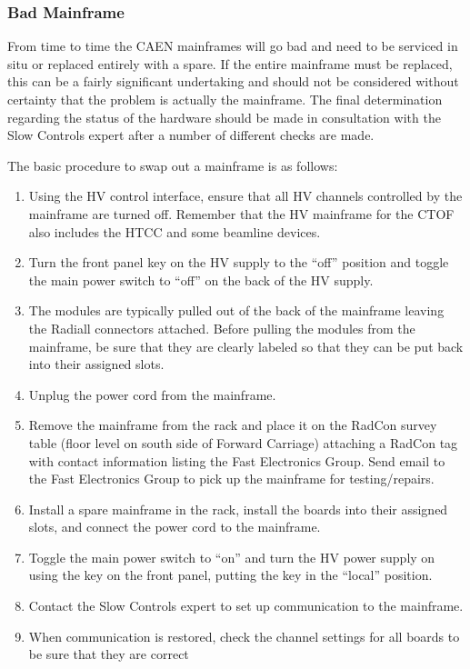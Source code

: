 \documentclass[12pt]{article}
\begin{document}
\subsubsection{Bad Mainframe}
\label{mainframe}

From time to time the CAEN mainframes will go bad and need to be serviced in situ or replaced entirely
with a spare. If the entire mainframe must be replaced, this can be a fairly significant undertaking and
should not be considered without certainty that the problem is actually the mainframe. The final
determination regarding the status of the hardware should be made in consultation with the Slow Controls
expert after a number of different checks are made.

The basic procedure to swap out a mainframe is as follows:

\begin{enumerate}
\item Using the HV control interface, ensure that all HV channels controlled by the mainframe are turned off.
Remember that the HV mainframe for the CTOF also includes the HTCC and some beamline devices.
\item Turn the front panel key on the HV supply to the ``off'' position and toggle the main power switch to
``off'' on the back of the HV supply.
\item The modules are typically pulled out of the back of the mainframe leaving the Radiall connectors
attached. Before pulling the modules from the mainframe, be sure that they are clearly labeled so that they
can be put back into their assigned slots.
\item Unplug the power cord from the mainframe.
\item Remove the mainframe from the rack and place it on the RadCon survey table (floor level on south side
of Forward Carriage) attaching a RadCon tag with contact information listing the Fast Electronics Group.
Send email to the Fast Electronics Group to pick up the mainframe for testing/repairs.
\item Install a spare mainframe in the rack, install the boards into their assigned slots, and connect the power
cord to the mainframe.
\item Toggle the main power switch to ``on'' and turn the HV power supply on using the key on the front panel,
putting the key in the ``local'' position.
\item Contact the Slow Controls expert to set up communication to the mainframe.
\item When communication is restored, check the channel settings for all boards to be sure that they are correct

\end{enumerate}
\end{document}

